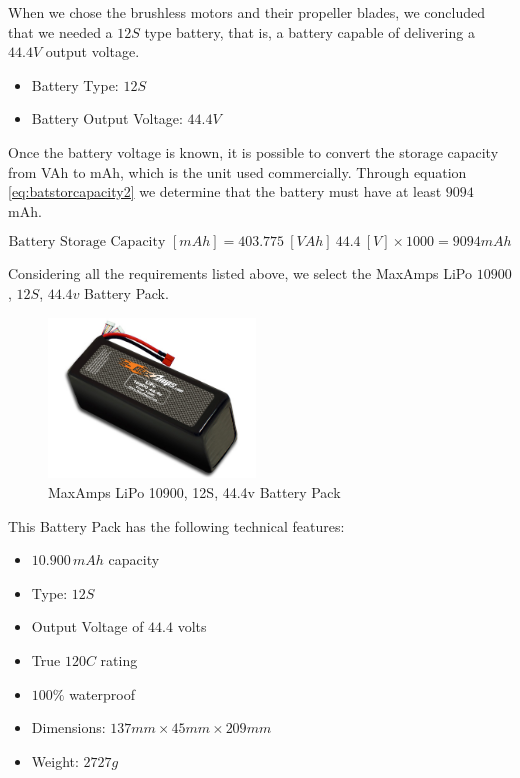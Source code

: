 \documentclass[english,fira]{ist-report}
\begin{document}
When we chose the brushless motors and their propeller blades, we concluded that we needed a $12S$ type battery, that is, a battery capable of delivering a $44.4V$ output voltage.
	
\begin{itemize}
    \item Battery Type: $12S$
    \item Battery Output Voltage: $44.4V$
\end{itemize}


Once the battery voltage is known, it is possible to convert the storage capacity from VAh to mAh, which is the unit used commercially. Through equation \ref{eq:batstorcapacity2} we determine that the battery must have at least $9094$ mAh.


\begin{equation} \label{eq:batstorcapacity2}
    \text{Battery Storage Capacity }[mAh]=403.775\ [VAh]\ 44.4\ [V]\times 1000=9094 mAh 
\end{equation}


Considering all the requirements listed above, we select the MaxAmps LiPo $10900$, $12S$, $44.4v$ Battery Pack.

\begin{figure}[ht]
    \centering
    \includegraphics[width=0.49\textwidth]{graphics/BrushlessMotorsforVtol/powerstorage.png}
    \caption{MaxAmps LiPo 10900, 12S, 44.4v Battery Pack}
    \label{fig:powerstorage}
\end{figure}
\newpage
This Battery Pack has the following technical features:
\begin{itemize}
    \item $10.900\,mAh$ capacity
    \item Type: $12S$
    \item Output Voltage of $44.4$ volts
    \item True $120C$ rating
    \item $100\%$ waterproof
    \item Dimensions: $137mm \times 45mm \times 209mm$
    \item Weight: $2727g$
\end{itemize}
\end{document}
